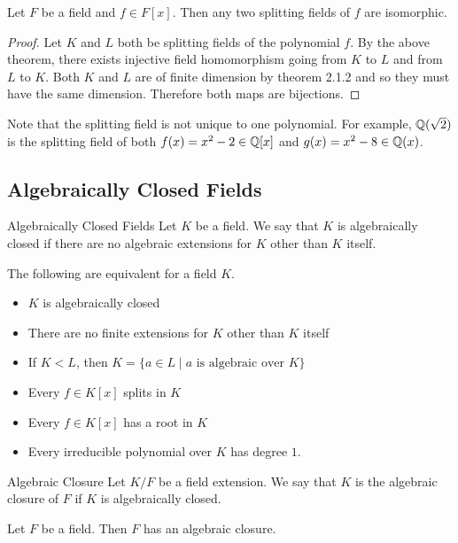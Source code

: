 \documentclass[a4paper]{article}
\begin{document}
\begin{crl}{}{} Let $F$ be a field and $f\in F[x]$. Then any two splitting fields of $f$ are isomorphic. \tcbline
\begin{proof}
Let $K$ and $L$ both be splitting fields of the polynomial $f$. By the above theorem, there exists injective field homomorphism going from $K$ to $L$ and from $L$ to $K$. Both $K$ and $L$ are of finite dimension by theorem 2.1.2 and so they must have the same dimension. Therefore both maps are bijections. 
\end{proof}
\end{crl}

Note that the splitting field is not unique to one polynomial. For example, $\mathbb{Q}(\sqrt{2})$ is the splitting field of both $f(x)=x^2-2\in\mathbb{Q}[x]$ and $g(x)=x^2-8\in\mathbb{Q}(x)$. 

\subsection{Algebraically Closed Fields}
\begin{defn}{Algebraically Closed Fields}{} Let $K$ be a field. We say that $K$ is algebraically closed if there are no algebraic extensions for $K$ other than $K$ itself. 
\end{defn}

\begin{lmm}{}{} The following are equivalent for a field $K$. 
\begin{itemize}
\item $K$ is algebraically closed
\item There are no finite extensions for $K$ other than $K$ itself
\item If $K<L$, then $K=\{a\in L\;|\;a\text{ is algebraic over }K\}$
\item Every $f\in K[x]$ splits in $K$
\item Every $f\in K[x]$ has a root in $K$\
\item Every irreducible polynomial over $K$ has degree $1$. 
\end{itemize}
\end{lmm}

\begin{defn}{Algebraic Closure}{} Let $K/F$ be a field extension. We say that $K$ is the algebraic closure of $F$ if $K$ is algebraically closed. 
\end{defn}

\begin{prp}{}{} Let $F$ be a field. Then $F$ has an algebraic closure. 
\end{prp}
\end{document}
